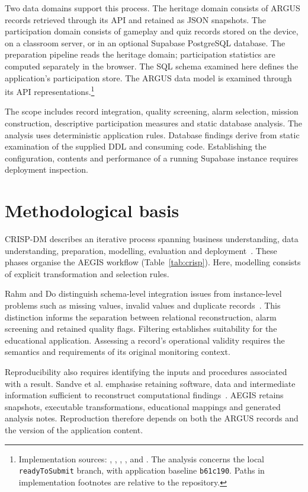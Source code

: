 \documentclass[10pt,a4paper]{article}
\begin{document}
Two data domains support this process. The heritage domain consists of ARGUS records retrieved through its API and retained as JSON snapshots. The participation domain consists of gameplay and quiz records stored on the device, on a classroom server, or in an optional Supabase PostgreSQL database. The preparation pipeline reads the heritage domain; participation statistics are computed separately in the browser. The SQL schema examined here defines the application's participation store. The ARGUS data model is examined through its API representations.\footnote{Implementation sources: , , , ,  and . The analysis concerns the local \texttt{readyToSubmit} branch, with application baseline \texttt{b61c190}. Paths in implementation footnotes are relative to the repository.}

The scope includes record integration, quality screening, alarm selection, mission construction, descriptive participation measures and static database analysis. The analysis uses deterministic application rules. Database findings derive from static examination of the supplied DDL and consuming code. Establishing the configuration, contents and performance of a running Supabase instance requires deployment inspection.

\section{Methodological basis}
CRISP-DM describes an iterative process spanning business understanding, data understanding, preparation, modelling, evaluation and deployment~\cite{crispdm}. These phases organise the AEGIS workflow (Table~\ref{tab:crisp}). Here, modelling consists of explicit transformation and selection rules.

Rahm and Do distinguish schema-level integration issues from instance-level problems such as missing values, invalid values and duplicate records~\cite{rahm2000}. This distinction informs the separation between relational reconstruction, alarm screening and retained quality flags. Filtering establishes suitability for the educational application. Assessing a record's operational validity requires the semantics and requirements of its original monitoring context.

Reproducibility also requires identifying the inputs and procedures associated with a result. Sandve et al. emphasise retaining software, data and intermediate information sufficient to reconstruct computational findings~\cite{sandve2013}. AEGIS retains snapshots, executable transformations, educational mappings and generated analysis notes. Reproduction therefore depends on both the ARGUS records and the version of the application content.
\end{document}
